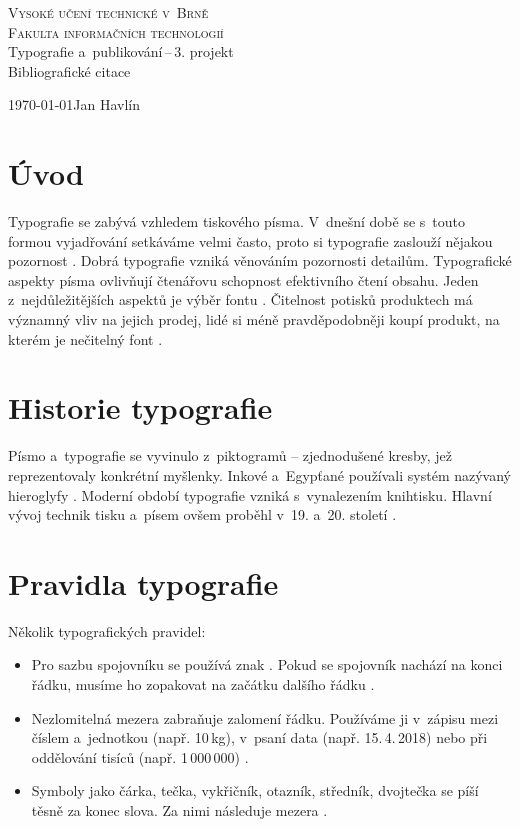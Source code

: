 \documentclass[11pt,a4paper]{article}
\begin{document}
\begin{titlepage}
\begin{center}
	\Huge
	\textsc{Vysoké učení technické v~Brně}\\
	\huge
	\textsc{Fakulta informačních technologií} \\
	\LARGE
	Typografie a~publikování\,--\,3. projekt \\
	\Huge
	Bibliografické citace
\end{center}
{\Large \today \hfill Jan Havlín}
\end{titlepage}
\section{Úvod}
Typografie se zabývá vzhledem tiskového písma. V~dnešní době se s~touto formou vyjadřování setkáváme velmi často, proto si typografie zaslouží nějakou pozornost \cite{leaning:begin}. Dobrá typografie vzniká věnováním pozornosti detailům. Typografické aspekty písma ovlivňují čtenářovu schopnost efektivního čtení obsahu. Jeden z~nejdůležitějších aspektů je výběr fontu \cite{journal:graphic}. Čitelnost potisků produktech má významný vliv na jejich prodej, lidé si méně pravděpodobněji koupí produkt, na kterém je nečitelný font \cite{journal:advertising}.

\section{Historie typografie}
Písmo a~typografie se vyvinulo z~piktogramů -- zjednodušené kresby, jež reprezentovaly konkrétní myšlenky. Inkové a~Egypťané používali systém nazývaný hieroglyfy \cite{master:historie}. Moderní období typografie vzniká s~vynalezením knihtisku. Hlavní vývoj technik tisku a~písem ovšem proběhl v~19. a~20. století \cite{bachelor:historie}.

\section{Pravidla typografie}
Několik typografických pravidel:
\begin{itemize}
\item{Pro sazbu spojovníku se používá znak \uv{\texttt{-}}. Pokud se spojovník nachází na konci řádku, musíme ho zopakovat na začátku dalšího řádku \cite{cstug:spojovnik}.}

\item{Nezlomitelná mezera zabraňuje zalomení řádku. Používáme ji v~zápisu mezi číslem a~jednotkou (např. 10\,kg), v~psaní data (např. 15.\,4.\,2018) nebo při oddělování tisíců (např. 1\,000\,000) \cite{kerslager:pravidla}.}

\item{Symboly jako čárka, tečka, vykřičník, otazník, středník, dvojtečka se píší těsně za konec slova. Za nimi následuje mezera \cite{wiki:pravidla}.}
\end{itemize}
\end{document}
